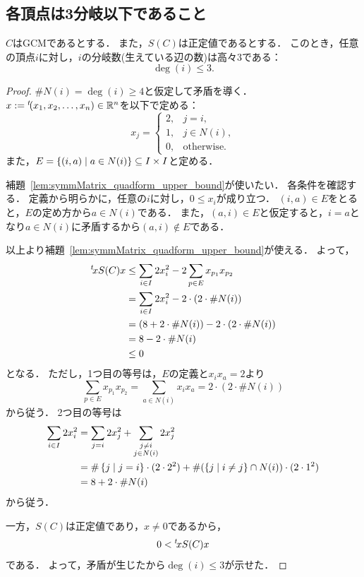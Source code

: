\subsection{各頂点は3分岐以下であること}

\begin{theorem}
  \label{thm:pos_degree_le_three}
  \leanok
  $C$はGCMであるとする．
  また，$S(C)$は正定値であるとする．
  このとき，任意の頂点$i$に対し，$i$の分岐数(生えている辺の数)は高々$3$である：
  \begin{equation}
    \deg(i) \le 3.
  \end{equation}
\end{theorem}

\begin{proof}
  $\# N(i) = \deg(i) \ge 4$と仮定して矛盾を導く．
  $x := {}^t\!(x_1, x_2, \ldots, x_n) \in \mathbb{R}^n$を以下で定める：
  \begin{equation}
    x_j = \begin{cases}
      2, & j = i,\\
      1, & j \in N(i),\\
      0, & \textrm{otherwise}.
    \end{cases}
  \end{equation}
  また，$E = \left\lbrace (i, a) \mathrel{} \middle| \mathrel{} a \in N(i) \right\rbrace \subseteq I \times I$と定める．

  補題~\ref{lem:symmMatrix_quadform_upper_bound}が使いたい．
  各条件を確認する．
  定義から明らかに，任意の$i$に対し，$0 \le x_i$が成り立つ．
  $(i, a) \in E$をとると，$E$の定め方から$a \in N(i)$である．
  また，$(a, i) \in E$と仮定すると，$i = a$となり$a \in N(i)$に矛盾するから$(a, i) \notin E$である．

  以上より補題~\ref{lem:symmMatrix_quadform_upper_bound}が使える．
  よって，
  \begin{align}
    {}^t\!x S(C) x
    &\le \sum_{i \in I} 2 x_i ^ 2 - 2 \sum_{p \in E} x_{p_1} x_{p_2} \\
    &= \sum_{i \in I} 2 x_i ^ 2 - 2 \cdot (2 \cdot \# N(i)) \\
    &= (8 + 2 \cdot \# N(i)) - 2 \cdot (2 \cdot \# N(i)) \\
    &= 8 - 2 \cdot \# N(i) \\
    &\le 0
  \end{align}
  となる．
  ただし，1つ目の等号は，$E$の定義と$x_i x_a = 2$より
  \begin{equation}
    \sum_{p \in E} x_{p_1} x_{p_2}
    = \sum_{a \in N(i)} x_{i} x_{a}
    = 2 \cdot (2 \cdot \# N(i))
  \end{equation}
  から従う．
  2つ目の等号は
  \begin{align}
    \sum_{i \in I} 2 x_i ^ 2
    &= \sum_{j = i} 2 x_j ^ 2 + \sum_{\substack{j \ne i \\ j \in N(i)}} 2 x_j ^ 2 \\
    &= \# \left\lbrace j \mathrel{} \middle| \mathrel{} j = i \right\rbrace \cdot (2 \cdot 2 ^ 2) + \# (\left\lbrace j \mathrel{} \middle| \mathrel{} i \ne j \right\rbrace \cap N(i)) \cdot (2 \cdot 1 ^ 2) \\
    &= 8 + 2 \cdot \# N(i)
  \end{align}
  から従う．

  一方，$S(C)$は正定値であり，$x \ne 0$であるから，
  \begin{equation}
    0 < {}^t\!x S(C) x
  \end{equation}
  である．
  よって，矛盾が生じたから$\deg(i) \le 3$が示せた．
\end{proof}